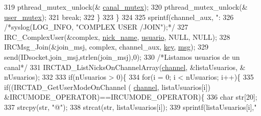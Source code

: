 \begin{DoxyCode}
{319                                                         pthread\_mutex\_unlock(&
      \hyperlink{_g-2361-06-_p1-_server_8c_ab86a544a49de18195048bac54dd3ac3e}{canal\_mutex});
320                                                         pthread\_mutex\_unlock(&
      \hyperlink{_g-2361-06-_p1-_server_8c_a5dedd07a1144d2ab70b74a8e64b6a7c0}{user\_mutex});
321                                                         \textcolor{keywordflow}{break};
322                                                 \}
323                                         \}
324 
325                                         sprintf(channel\_aux, \textcolor{stringliteral}{":%
326                                         \textcolor{comment}{/*syslog(LOG\_INFO, "COMPLEX USER /JOIN");*/}
327                                         IRC\_ComplexUser(&complex, \hyperlink{_g-2361-06-_p1-_server_8c_aabbf66718cda228b924a4a9441eadf62}{nick\_name}, 
      \hyperlink{_g-2361-06-_p1-_server_8c_a0147a5b81499984f9cb00379a8cb84af}{usuario}, NULL, NULL);
328                                         IRCMsg\_Join(&join\_msj, complex, channel\_aux, 
      \hyperlink{_g-2361-06-_p1-_server_8c_a5892a9181e6a332f84d27aecd41dcd12}{key}, \hyperlink{_g-2361-06-_p1-_server_8c_a32d2f5216cddb59c7cc8fb2806a7e727}{msg});
329                                         send(IDsocket,join\_msj,strlen(join\_msj),0);
330                                         \textcolor{comment}{/*Listamos usuarios de un canal*/}
331                                         IRCTAD\_ListNicksOnChannelArray(\hyperlink{_g-2361-06-_p1-_server_8c_a842ca2f026578e5c479c095ff3335969}{channel}, &listaUsuarios, &
      nUsuarios);
332 
333                                         \textcolor{keywordflow}{if}(nUsuarios > 0)\{
334                                                 \textcolor{keywordflow}{for}(i = 0; i < nUsuarios; i++)\{
335                                                         \textcolor{keywordflow}{if}((IRCTAD\_GetUserModeOnChannel (
      \hyperlink{_g-2361-06-_p1-_server_8c_a842ca2f026578e5c479c095ff3335969}{channel}, listaUsuarios[i]) &IRCUMODE\_OPERATOR)==IRCUMODE\_OPERATOR)\{
336                                                                 \textcolor{keywordtype}{char} str[20];
337                                                                 strcpy(str, \textcolor{stringliteral}{"@"});
338                                                                 strcat(str, listaUsuarios[i]);
339                                                                 sprintf(listaUsuarios[i],\textcolor{stringliteral}{"%
}}}
\end{DoxyCode}
